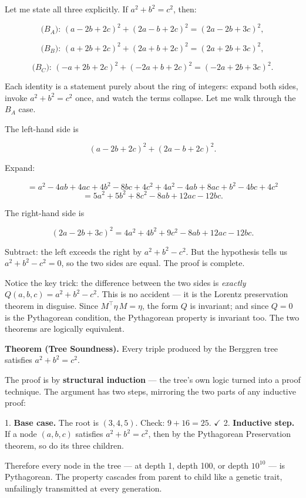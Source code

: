 \documentclass[12pt, letterpaper, openany]{book}
\theoremstyle{definition}
\theoremstyle{remark}
\begin{document}
Let me state all three explicitly. If $a^2 + b^2 = c^2$, then:

\[
\text{($B_A$): } (a - 2b + 2c)^2 + (2a - b + 2c)^2 = (2a - 2b + 3c)^2,
\]

\[
\text{($B_B$): } (a + 2b + 2c)^2 + (2a + b + 2c)^2 = (2a + 2b + 3c)^2,
\]

\[
\text{($B_C$): } (-a + 2b + 2c)^2 + (-2a + b + 2c)^2 = (-2a + 2b + 3c)^2.
\]

Each identity is a statement purely about the ring of integers: expand both sides, invoke $a^2 + b^2 = c^2$ once, and watch the terms collapse. Let me walk through the $B_A$ case.

The left-hand side is

\[
(a - 2b + 2c)^2 + (2a - b + 2c)^2.
\]

Expand:

\[
= a^2 - 4ab + 4ac + 4b^2 - 8bc + 4c^2 + 4a^2 - 4ab + 8ac + b^2 - 4bc + 4c^2
\]
\[
= 5a^2 + 5b^2 + 8c^2 - 8ab + 12ac - 12bc.
\]

The right-hand side is

\[
(2a - 2b + 3c)^2 = 4a^2 + 4b^2 + 9c^2 - 8ab + 12ac - 12bc.
\]

Subtract: the left exceeds the right by $a^2 + b^2 - c^2$. But the hypothesis tells us $a^2 + b^2 - c^2 = 0$, so the two sides are equal. The proof is complete.

Notice the key trick: the difference between the two sides is \textit{exactly} $Q(a, b, c) = a^2 + b^2 - c^2$. This is no accident --- it is the Lorentz preservation theorem in disguise. Since $M^\top \eta\, M = \eta$, the form $Q$ is invariant; and since $Q = 0$ is the Pythagorean condition, the Pythagorean property is invariant too. The two theorems are logically equivalent.

\textbf{Theorem (Tree Soundness).} Every triple produced by the Berggren tree satisfies $a^2 + b^2 = c^2$.

The proof is by \textbf{structural induction} --- the tree's own logic turned into a proof technique. The argument has two steps, mirroring the two parts of any inductive proof:

1. \textbf{Base case.} The root is $(3, 4, 5)$. Check: $9 + 16 = 25$. {$\checkmark$}
2. \textbf{Inductive step.} If a node $(a, b, c)$ satisfies $a^2 + b^2 = c^2$, then by the Pythagorean Preservation theorem, so do its three children.

Therefore every node in the tree --- at depth 1, depth 100, or depth $10^{10}$ --- is Pythagorean. The property cascades from parent to child like a genetic trait, unfailingly transmitted at every generation.
\end{document}
